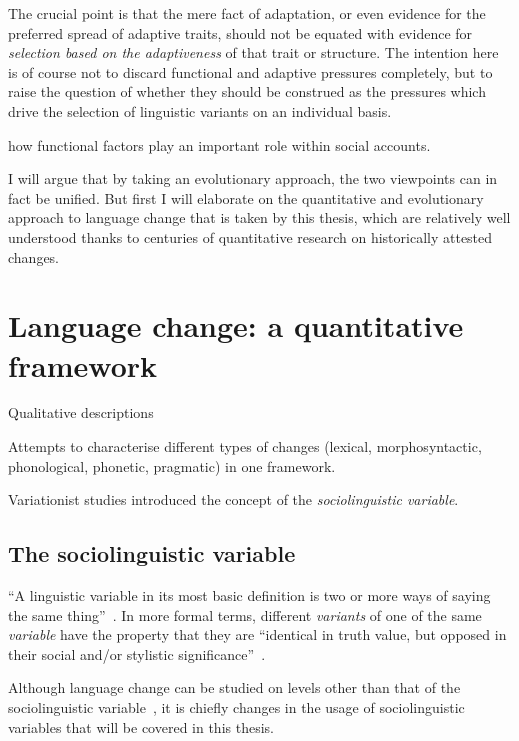 The crucial point is that the mere fact of adaptation, or even evidence for the preferred spread of adaptive traits, should not be equated with evidence for \emph{selection based on the adaptiveness} of that trait or structure. %
The intention here is of course not to discard functional and adaptive pressures completely, but to raise the question of whether they should be construed as the pressures which drive the selection of linguistic variants on an individual basis.

 how functional factors play an important role within social accounts.


I will argue that by taking an evolutionary approach, the two viewpoints can in fact be unified.
But first I will elaborate on the quantitative and evolutionary approach to language change that is taken by this thesis, which are relatively well understood thanks to centuries of quantitative research on historically attested changes.

\section{Language change: a quantitative framework}

Qualitative descriptions

Attempts to characterise different types of changes (lexical, morphosyntactic, phonological, phonetic, pragmatic) in one framework.

Variationist studies introduced the concept of the \emph{sociolinguistic variable}.

\subsection{The sociolinguistic variable}
\label{sec:sociolinguisticvariable}



``A linguistic variable in its most basic definition is two or more ways of saying the same thing''~\citep[p.4]{Tagliamonte2012}.
In more formal terms, different \emph{variants} of one of the same \emph{variable} have the property that they are ``identical in truth value, but opposed in their social and/or stylistic significance''~\citep[p.271]{Labov1972}. %


Although language change can be studied on levels other than that of the sociolinguistic variable~\citep[see in particular][p.98]{Croft2006}, it is chiefly changes in the usage of sociolinguistic variables that will be covered in this thesis.

